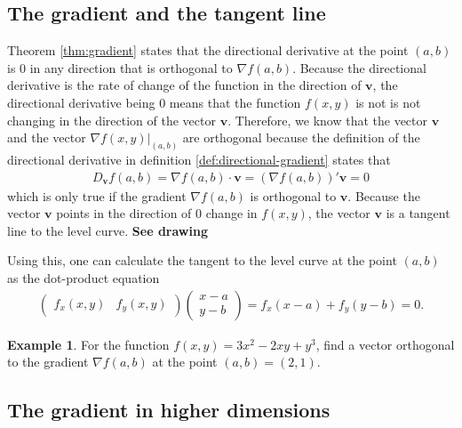 \documentclass[
]{book}
\theoremstyle{definition}
\theoremstyle{definition}
\newtheorem{example}{Example}[chapter]
\theoremstyle{definition}
\theoremstyle{remark}
\begin{document}
\hypertarget{the-gradient-and-the-tangent-line}{%
\subsection{The gradient and the tangent line}\label{the-gradient-and-the-tangent-line}}

Theorem \ref{thm:gradient} states that the directional derivative at the point \((a, b)\) is 0 in any direction that is orthogonal to \(\nabla f(a, b)\). Because the directional derivative is the rate of change of the function in the direction of \(\mathbf{v}\), the directional derivative being 0 means that the function \(f(x, y)\) is not is not changing in the direction of the vector \(\mathbf{v}\). Therefore, we know that the vector \(\mathbf{v}\) and the vector \(\nabla f(x, y)|_{(a,b)}\) are orthogonal because the definition of the directional derivative in definition \ref{def:directional-gradient} states that
\[
\begin{aligned}
D_{\mathbf{v}} f(a, b)  = \nabla f(a, b) \cdot \mathbf{v} = \left(\nabla f(a, b) \right)'  \mathbf{v} = 0
\end{aligned}
\]
which is only true if the gradient \(\nabla f(a, b)\) is orthogonal to \(\mathbf{v}\). Because the vector \(\mathbf{v}\) points in the direction of 0 change in \(f(x,y)\), the vector \(\mathbf{v}\) is a tangent line to the level curve. \textbf{See drawing}

Using this, one can calculate the tangent to the level curve at the point \((a, b)\) as the dot-product equation
\[
\begin{aligned}
\begin{pmatrix} f_x(x, y) & f_y(x, y) \end{pmatrix} \begin{pmatrix} x - a \\ y - b \end{pmatrix} =  f_x (x-a) + f_y (y-b) = 0.
\end{aligned}
\]

\begin{example}
\protect\hypertarget{exm:unnamed-chunk-290}{}{\label{exm:unnamed-chunk-290} }For the function \(f(x, y) = 3x^2 - 2xy + y^3\), find a vector orthogonal to the gradient \(\nabla f(a, b)\) at the point \((a, b) = (2, 1)\).
\end{example}

\hypertarget{the-gradient-in-higher-dimensions}{%
\subsection{The gradient in higher dimensions}\label{the-gradient-in-higher-dimensions}}
\end{document}
